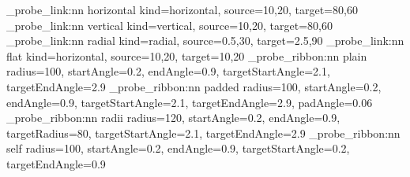 \documentclass{article}
\begin{document}
\ExplSyntaxOn
{}
\semio_probe_link:nn { horizontal } { kind=horizontal, source={10,20}, target={80,60} }
\semio_probe_link:nn { vertical }   { kind=vertical,   source={10,20}, target={80,60} }
\semio_probe_link:nn { radial }     { kind=radial,     source={0.5,30}, target={2.5,90} }
\semio_probe_link:nn { flat }       { kind=horizontal, source={10,20}, target={10,20} }
\semio_probe_ribbon:nn { plain }
  { radius=100, startAngle=0.2, endAngle=0.9, targetStartAngle=2.1, targetEndAngle=2.9 }
\semio_probe_ribbon:nn { padded }
  { radius=100, startAngle=0.2, endAngle=0.9, targetStartAngle=2.1, targetEndAngle=2.9, padAngle=0.06 }
\semio_probe_ribbon:nn { radii }
  { radius=120, startAngle=0.2, endAngle=0.9, targetRadius=80, targetStartAngle=2.1, targetEndAngle=2.9 }
\semio_probe_ribbon:nn { self }
  { radius=100, startAngle=0.2, endAngle=0.9, targetStartAngle=0.2, targetEndAngle=0.9 }
\SemioVizProbeEnd
\ExplSyntaxOff
\end{document}
